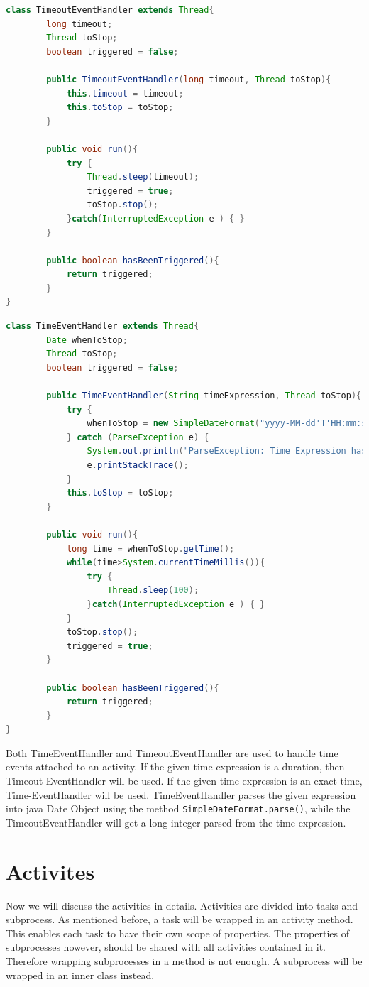 \begin{lstlisting}[language=Java , caption=TimeoutEventHandler implementation]
class TimeoutEventHandler extends Thread{
		long timeout;
		Thread toStop;
		boolean triggered = false;
		
		public TimeoutEventHandler(long timeout, Thread toStop){
			this.timeout = timeout;
			this.toStop = toStop;
		}
		
		public void run(){
			try {
				Thread.sleep(timeout);
				triggered = true;
				toStop.stop();
			}catch(InterruptedException e ) { }
		}
		
		public boolean hasBeenTriggered(){
			return triggered;
		}
}
\end{lstlisting}
\begin{lstlisting}[language=Java , caption=TimeEventHandler implementation]
class TimeEventHandler extends Thread{
		Date whenToStop;
		Thread toStop;
		boolean triggered = false;
		
		public TimeEventHandler(String timeExpression, Thread toStop){
			try {
				whenToStop = new SimpleDateFormat("yyyy-MM-dd'T'HH:mm:ss.SSSZ").parse(timeExpression);
			} catch (ParseException e) {
				System.out.println("ParseException: Time Expression has to be in yyyy-MM-dd'T'HH:mm:ss.SSSZ format!");
				e.printStackTrace();
			} 
			this.toStop = toStop;
		}
		
		public void run(){
			long time = whenToStop.getTime();
			while(time>System.currentTimeMillis()){
				try {
					Thread.sleep(100);
				}catch(InterruptedException e ) { }
			}
			toStop.stop();
			triggered = true;
		}
		
		public boolean hasBeenTriggered(){
			return triggered;
		}
}
\end{lstlisting}

Both TimeEventHandler and TimeoutEventHandler are used to handle time events attached to an activity. If the given time expression is a duration, then Timeout-EventHandler will be used. If the given time expression is an exact time, Time-EventHandler will be used. TimeEventHandler parses the given expression into java Date Object using the method \verb|SimpleDateFormat.parse()|, while the TimeoutEventHandler will get a long integer parsed from the time expression. 

\newpage
\section{Activites}
Now we will discuss the activities in details. Activities are divided into tasks and subprocess. As mentioned before, a task will be wrapped in an activity method. This enables each task to have their own scope of properties. The properties of subprocesses however, should be shared with all activities contained in it. Therefore wrapping subprocesses in a method is not enough. A subprocess will be wrapped in an inner class instead.
 
